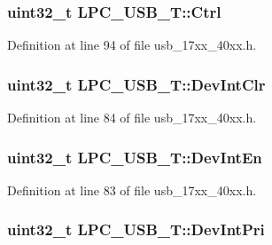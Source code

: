 \subsubsection[{\texorpdfstring{Ctrl}{Ctrl}}]{ uint32\+\_\+t L\+P\+C\+\_\+\+U\+S\+B\+\_\+\+T\+::\+Ctrl}\hypertarget{structLPC__USB__T_a52467751546ac67a62a5e5218a16d519}{}\label{structLPC__USB__T_a52467751546ac67a62a5e5218a16d519}


Definition at line 94 of file usb\+\_\+17xx\+\_\+40xx.\+h.

\subsubsection[{\texorpdfstring{Dev\+Int\+Clr}{DevIntClr}}]{ uint32\+\_\+t L\+P\+C\+\_\+\+U\+S\+B\+\_\+\+T\+::\+Dev\+Int\+Clr}\hypertarget{structLPC__USB__T_a9d7963de0a38d59de5e1016eb7c0c9ab}{}\label{structLPC__USB__T_a9d7963de0a38d59de5e1016eb7c0c9ab}


Definition at line 84 of file usb\+\_\+17xx\+\_\+40xx.\+h.

\subsubsection[{\texorpdfstring{Dev\+Int\+En}{DevIntEn}}]{ uint32\+\_\+t L\+P\+C\+\_\+\+U\+S\+B\+\_\+\+T\+::\+Dev\+Int\+En}\hypertarget{structLPC__USB__T_adc2785d68433de49a07b40f3fb9a5c5c}{}\label{structLPC__USB__T_adc2785d68433de49a07b40f3fb9a5c5c}


Definition at line 83 of file usb\+\_\+17xx\+\_\+40xx.\+h.

\subsubsection[{\texorpdfstring{Dev\+Int\+Pri}{DevIntPri}}]{ uint32\+\_\+t L\+P\+C\+\_\+\+U\+S\+B\+\_\+\+T\+::\+Dev\+Int\+Pri}\hypertarget{structLPC__USB__T_a2c72e3f40ea52fdaf762a3e2c2504c9f}{}\label{structLPC__USB__T_a2c72e3f40ea52fdaf762a3e2c2504c9f}


